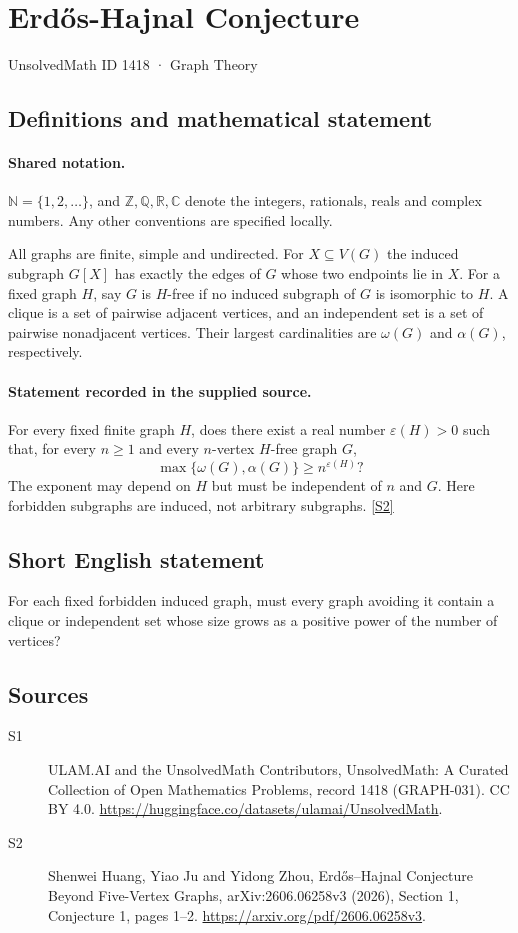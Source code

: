 \documentclass[11pt]{article}
\newcommand{\sref}[2]{\hyperlink{source:#1:#2}{[S#2]}}
\begin{document}
\setcounter{section}{1417}
\section{Erdős-Hajnal Conjecture}\label{1418}
{\small\sffamily UnsolvedMath ID 1418 · Graph Theory}
\subsection{Definitions and mathematical statement}

\paragraph{Shared notation.}$\mathbb N=\{1,2,\ldots\}$, and $\mathbb Z,\mathbb Q,\mathbb R,\mathbb C$ denote the integers, rationals, reals and complex numbers. Any other conventions are specified locally.


All graphs are finite, simple and undirected. For $X\subseteq V(G)$ the induced subgraph $G[X]$ has exactly the edges of $G$ whose two endpoints lie in $X$. For a fixed graph $H$, say $G$ is $H$-free if no induced subgraph of $G$ is isomorphic to $H$. A clique is a set of pairwise adjacent vertices, and an independent set is a set of pairwise nonadjacent vertices. Their largest cardinalities are $\omega(G)$ and $\alpha(G)$, respectively.
\paragraph{Statement recorded in the supplied source.}
For every fixed finite graph $H$, does there exist a real number $\varepsilon(H)>0$ such that, for every $n\ge1$ and every $n$-vertex $H$-free graph $G$,
\[
 \max\{\omega(G),\alpha(G)\}\ge n^{\varepsilon(H)}?
\]
The exponent may depend on $H$ but must be independent of $n$ and $G$. Here forbidden subgraphs are induced, not arbitrary subgraphs. \sref{1418}{2}
\subsection{Short English statement}
For each fixed forbidden induced graph, must every graph avoiding it contain a clique or independent set whose size grows as a positive power of the number of vertices?
\subsection{Sources}
\begin{description}
\item[\hypertarget{source:1418:1}{S1}] ULAM.AI and the UnsolvedMath Contributors, UnsolvedMath: A Curated Collection of Open Mathematics Problems, record 1418 (GRAPH-031). CC BY 4.0. \url{https://huggingface.co/datasets/ulamai/UnsolvedMath}.
\item[\hypertarget{source:1418:2}{S2}] Shenwei Huang, Yiao Ju and Yidong Zhou, Erdős–Hajnal Conjecture Beyond Five-Vertex Graphs, arXiv:2606.06258v3 (2026), Section 1, Conjecture 1, pages 1--2. \url{https://arxiv.org/pdf/2606.06258v3}.
\end{description}
\label{end:1418}
\end{document}

